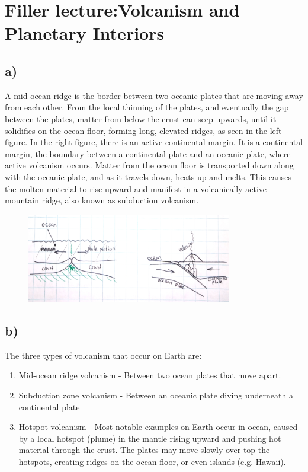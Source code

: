 \section{ Filler lecture:Volcanism and Planetary Interiors }\label{sec:q2}    

\subsection*{a)}
A mid-ocean ridge is the border between two oceanic plates that are moving away from each other. From the local thinning of the plates, and eventually the gap between the plates, matter from below the crust can seep upwards, until it solidifies on the ocean floor, forming long, elevated ridges, as seen in the left figure. In the right figure, there is an active continental margin. It is a continental margin, the boundary between a continental plate and an oceanic plate, where active volcanism occurs. Matter from the ocean floor is transported down along with the oceanic plate, and as it travels down, heats up and melts. This causes the molten material to rise upward and manifest in a volcanically active mountain ridge, also known as subduction volcanism. 
\begin{figure}[H]
    \centering
    \includegraphics[width=0.8\textwidth]{figures/2b.jpg}
    \label{fig:my_label2}
\end{figure}

\subsection*{b)}
The three types of volcanism that occur on Earth are:
\begin{enumerate}
    \item Mid-ocean ridge volcanism - Between two ocean plates that move apart.
    \item Subduction zone volcanism - Between an oceanic plate diving underneath a continental plate
    \item Hotspot volcanism - Most notable examples on Earth occur in ocean, caused by a local hotspot (plume) in the mantle rising upward and pushing hot material through the crust. The plates may move slowly over-top the hotspots, creating ridges on the ocean floor, or even islands (e.g. Hawaii).
\end{enumerate}

